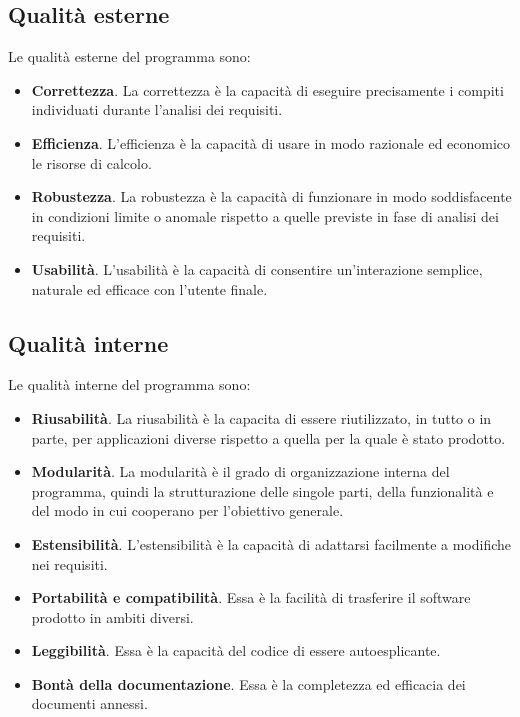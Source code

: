 \documentclass[12pt]{report}
\begin{document}
	\subsection{Qualità esterne}
	Le qualità esterne del programma sono:
	\begin{itemize}
		\item \textbf{Correttezza}. La correttezza è la capacità di eseguire precisamente i compiti individuati durante l'analisi dei requisiti.
		\item \textbf{Efficienza}. L'efficienza è la capacità di usare in modo razionale ed economico le risorse di calcolo.
		\item \textbf{Robustezza}. La robustezza è la capacità di funzionare in modo soddisfacente in condizioni limite o anomale rispetto a quelle previste in fase di analisi dei requisiti.
		\item \textbf{Usabilità}. L'usabilità è la capacità di consentire un'interazione semplice, naturale ed efficace con l'utente finale.
	\end{itemize}
	\subsection{Qualità interne}
	Le qualità interne del programma sono:
	\begin{itemize}
		\item \textbf{Riusabilità}. La riusabilità è la capacita di essere riutilizzato, in tutto o in parte, per applicazioni diverse rispetto a quella per la quale è stato prodotto.
		\item \textbf{Modularità}. La modularità è il grado di organizzazione interna del programma, quindi la strutturazione delle singole parti, della funzionalità e del modo in cui cooperano per l'obiettivo generale.
		\item \textbf{Estensibilità}. L'estensibilità è la capacità di adattarsi facilmente a modifiche nei requisiti.
		\item \textbf{Portabilità e compatibilità}. Essa è la facilità di trasferire il software prodotto in ambiti diversi.
		\item \textbf{Leggibilità}. Essa è la capacità del codice di essere autoesplicante.
		\item \textbf{Bontà della documentazione}. Essa è la completezza ed efficacia dei documenti annessi.
	\end{itemize}
\end{document}
